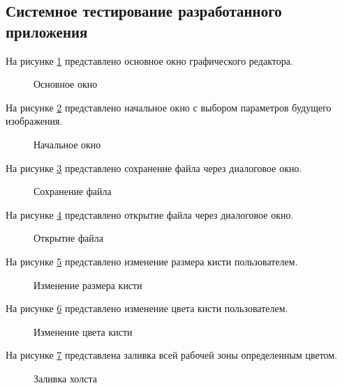 \renewcommand{\arraystretch}{1.0} %

\subsection{Системное тестирование разработанного приложения}

На рисунке \ref{osn:image} представлено основное окно графического редактора.
\newpage %
\begin{figure}[H] %
\caption{Основное окно}
\label{osn:image}
\end{figure}

На рисунке \ref{vvod:image} представлено начальное окно с выбором параметров будущего изображения.

\begin{figure}[H]
\caption{Начальное окно}
\label{vvod:image}
\end{figure}

На рисунке \ref{sve:image} представлено сохранение файла через диалоговое окно.

\begin{figure}[H]
\caption{Сохранение файла}
\label{sve:image}
\end{figure}

На рисунке \ref{ope:image} представлено открытие файла через диалоговое окно.

\begin{figure}[H]
	\caption{Открытие файла}
	\label{ope:image}
\end{figure}

На рисунке \ref{size:image} представлено изменение размера кисти пользователем.

\begin{figure}[H]
	\caption{Изменение размера кисти}
	\label{size:image}
\end{figure}

На рисунке \ref{clr:image} представлено изменение цвета кисти пользователем.

\begin{figure}[H]
	\caption{Изменение цвета кисти}
	\label{clr:image}
\end{figure}

На рисунке \ref{hlst:image} представлена заливка всей рабочей зоны определенным цветом.

\begin{figure}[H]
	\caption{Заливка холста}
	\label{hlst:image}
\end{figure}
